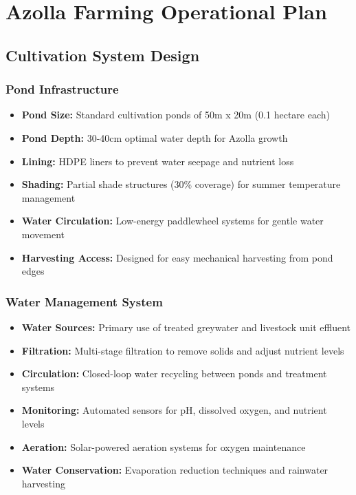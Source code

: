 \section{Azolla Farming Operational Plan}

\subsection{Cultivation System Design}

\subsubsection{Pond Infrastructure}
\begin{itemize}
    \item \textbf{Pond Size:} Standard cultivation ponds of 50m x 20m (0.1 hectare each)
    \item \textbf{Pond Depth:} 30-40cm optimal water depth for Azolla growth
    \item \textbf{Lining:} HDPE liners to prevent water seepage and nutrient loss
    \item \textbf{Shading:} Partial shade structures (30\% coverage) for summer temperature management
    \item \textbf{Water Circulation:} Low-energy paddlewheel systems for gentle water movement
    \item \textbf{Harvesting Access:} Designed for easy mechanical harvesting from pond edges
\end{itemize}

\subsubsection{Water Management System}
\begin{itemize}
    \item \textbf{Water Sources:} Primary use of treated greywater and livestock unit effluent
    \item \textbf{Filtration:} Multi-stage filtration to remove solids and adjust nutrient levels
    \item \textbf{Circulation:} Closed-loop water recycling between ponds and treatment systems
    \item \textbf{Monitoring:} Automated sensors for pH, dissolved oxygen, and nutrient levels
    \item \textbf{Aeration:} Solar-powered aeration systems for oxygen maintenance
    \item \textbf{Water Conservation:} Evaporation reduction techniques and rainwater harvesting
\end{itemize}

